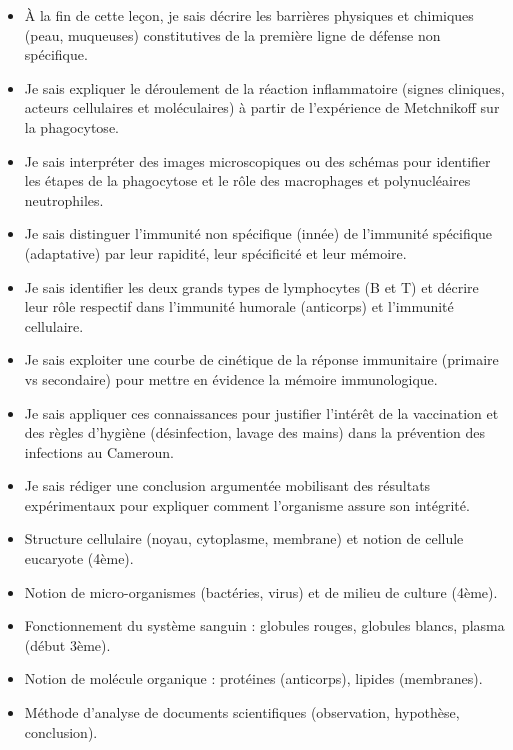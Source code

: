 \documentclass[11pt]{article}
\begin{document}
\begin{objectifs}
\begin{itemize}
\item À la fin de cette leçon, je sais décrire les barrières physiques et chimiques (peau, muqueuses) constitutives de la première ligne de défense non spécifique.
\item Je sais expliquer le déroulement de la réaction inflammatoire (signes cliniques, acteurs cellulaires et moléculaires) à partir de l'expérience de Metchnikoff sur la phagocytose.
\item Je sais interpréter des images microscopiques ou des schémas pour identifier les étapes de la phagocytose et le rôle des macrophages et polynucléaires neutrophiles.
\item Je sais distinguer l'immunité non spécifique (innée) de l'immunité spécifique (adaptative) par leur rapidité, leur spécificité et leur mémoire.
\item Je sais identifier les deux grands types de lymphocytes (B et T) et décrire leur rôle respectif dans l'immunité humorale (anticorps) et l'immunité cellulaire.
\item Je sais exploiter une courbe de cinétique de la réponse immunitaire (primaire vs secondaire) pour mettre en évidence la mémoire immunologique.
\item Je sais appliquer ces connaissances pour justifier l'intérêt de la vaccination et des règles d'hygiène (désinfection, lavage des mains) dans la prévention des infections au Cameroun.
\item Je sais rédiger une conclusion argumentée mobilisant des résultats expérimentaux pour expliquer comment l'organisme assure son intégrité.
\end{itemize}
\end{objectifs}

\begin{prerequis}
\begin{itemize}
\item Structure cellulaire (noyau, cytoplasme, membrane) et notion de cellule eucaryote (4ème).
\item Notion de micro-organismes (bactéries, virus) et de milieu de culture (4ème).
\item Fonctionnement du système sanguin : globules rouges, globules blancs, plasma (début 3ème).
\item Notion de molécule organique : protéines (anticorps), lipides (membranes).
\item Méthode d'analyse de documents scientifiques (observation, hypothèse, conclusion).
\end{itemize}
\end{prerequis}
\end{document}
